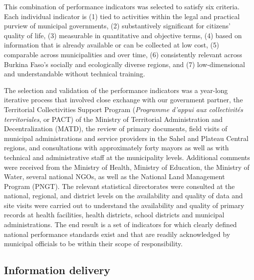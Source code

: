 \documentclass[11pt]{article}
\begin{document}
This combination of performance indicators was selected to satisfy six criteria. Each individual indicator is (1) tied to activities within the legal and practical purview of municipal governments, (2) substantively significant for citizens' quality of life, (3) measurable in quantitative and objective terms, (4) based on information that is already available or can be collected at low cost, (5) comparable across municipalities and over time, (6) consistently relevant across Burkina Faso's socially and ecologically diverse regions, and (7) low-dimensional and understandable without technical training. 

The selection and validation of the performance indicators was a year-long iterative process that involved close exchange with our government partner, the Territorial Collectivities Support Program (\emph{Programme d'appui aux collectivit\'{e}s territoriales}, or PACT) of the Ministry of Territorial Administration and Decentralization (MATD), the review of primary documents, field visits of municipal administrations and service providers in the Sahel and Plateau Central regions, and consultations with approximately forty mayors as well as with technical and administrative staff at the municipality levels. Additional comments were received from the Ministry of Health, Ministry of Education, the Ministry of Water, several national NGOs, as well as the National Land Management Program (PNGT). The relevant statistical directorates were consulted at the national, regional, and district levels on the availability and quality of data and site visits were carried out to understand the availability and quality of primary records at health facilities, health districts, school districts and municipal administrations. The end result is a set of indicators for which clearly defined national performance standards exist and that are readily acknowledged by municipal officials to be within their scope of responsibility. 

\subsection{Information delivery}

\end{document}
